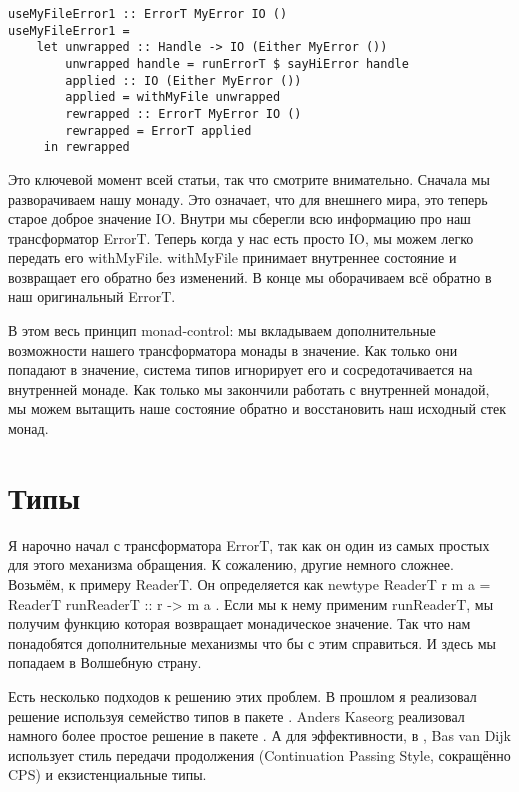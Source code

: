 \begin{lstlisting}
useMyFileError1 :: ErrorT MyError IO ()
useMyFileError1 =
    let unwrapped :: Handle -> IO (Either MyError ())
        unwrapped handle = runErrorT $ sayHiError handle
        applied :: IO (Either MyError ())
        applied = withMyFile unwrapped
        rewrapped :: ErrorT MyError IO ()
        rewrapped = ErrorT applied
     in rewrapped
\end{lstlisting}

Это ключевой момент всей статьи, так что смотрите внимательно. Сначала мы
разворачиваем нашу монаду. Это означает, что для внешнего мира, это теперь
старое доброе значение IO. Внутри мы сберегли всю информацию про наш
трансформатор ErrorT. Теперь когда у нас есть просто IO, мы можем легко
передать его withMyFile. withMyFile принимает внутреннее состояние и возвращает
его обратно без изменений. В конце мы оборачиваем всё обратно в наш
оригинальный ErrorT.

В этом весь принцип monad-control: мы вкладываем дополнительные возможности
нашего трансформатора монады в значение. Как только они попадают в значение,
система типов игнорирует его и сосредотачивается на внутренней монаде. Как
только мы закончили работать с внутренней монадой, мы можем вытащить наше
состояние обратно и восстановить наш исходный стек монад.

\section{Типы}
Я нарочно начал с трансформатора ErrorT, так как он один из самых простых для
этого механизма обращения. К сожалению, другие немного сложнее. Возьмём, к
примеру ReaderT. Он определяется как newtype ReaderT r m a = ReaderT {
runReaderT :: r -> m a }. Если мы к нему применим runReaderT, мы получим
функцию которая возвращает монадическое значение. Так что нам понадобятся
дополнительные механизмы что бы с этим справиться. И здесь мы попадаем в
Волшебную страну.

Есть несколько подходов к решению этих проблем. В прошлом я реализовал решение
используя семейство типов в пакете
. Anders
Kaseorg реализовал намного более простое решение в пакете
. А для
эффективности, в
,
Bas van Dijk использует стиль передачи продолжения (Continuation Passing Style,
сокращённо CPS) и екзистенциальные типы.

